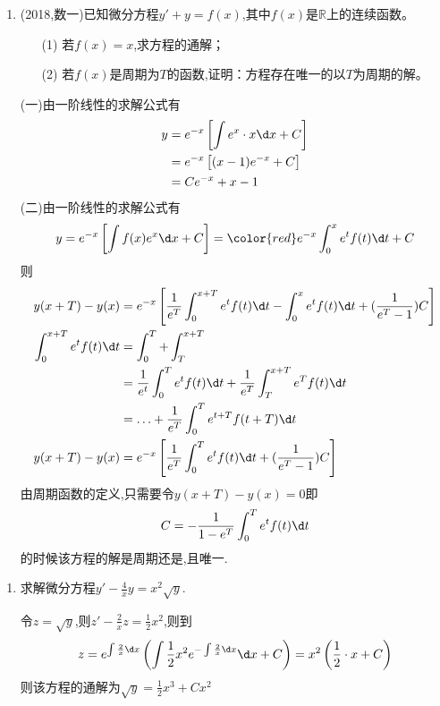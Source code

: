 \documentclass[12pt, a4paper, oneside, UTF8]{ctexbook}
\begin{document}
\begin{enumerate}[label=\arabic*.,start=5]
    \item (2018,数一)已知微分方程$y'+y=f(x)$,其中$f(x)$是$\mathbb{R}$上的连续函数。
    \begin{enumerate}[label=(\roman*)]
        \item[(1)] 若$f(x)=x$,求方程的通解；
        \item[(2)] 若$f(x)$是周期为$T$的函数,证明：方程存在唯一的以$T$为周期的解。
    \end{enumerate}
    
    \begin{solution}
    (一)由一阶线性的求解公式有 
    \begin{align*}
        y &= e^{-x}\left[\int e^x\cdot x\d x + C\right] \\
        &=e^{-x}\left[(x-1)e^{-x}+C\right]\\
        &=Ce^{-x}+x-1
    \end{align*}
    (二)由一阶线性的求解公式有
    $$
    y=e^{-x}\left[\int f(x)e^{x}\d x + C\right] = {\color{red} e^{-x}\int_{0}^{x}e^{t}f(t)\d t+C}
    $$
    则
    \begin{align*}
        y(x+T)-y(x) &= e^{-x}\left[\frac{1}{e^T}\int_{0}^{x+T}e^{t}f(t)\d t - 
        \int_{0}^{x}e^{t}f(t)\d t + (\frac{1}{e^{T}-1})C\right] \\
        \int_{0}^{x+T}e^{t}f(t)\d t &=\int_{0}^{T}+\int_{T}^{x+T} \\
        &=\frac{1}{e^{t}}\int_{0}^{T}e^{t}f(t)\d t + \frac{1}{e^T}\int_{T}^{x+T}e^{T}f(t)\d t \\
        &=\ldots + \frac{1}{e^T}\int_{0}^{T}e^{t+T}f(t+T)\d t \\
        y(x+T)-y(x) & = e^{-x}\left[\frac{1}{e^{T}}\int_{0}^{T}e^{t}f(t)\d t + (\frac{1}{e^{T}-1})C \right] 
    \end{align*}
    由周期函数的定义,只需要令$y(x+T)-y(x)=0$即
    $$
    C = -\frac{1}{1-e^T}\int_{0}^{T}e^tf(t)\d t
    $$
    的时候该方程的解是周期还是,且唯一.
    \end{solution}
\end{enumerate}


\begin{enumerate}[label=\arabic*.,start=6]
    \item 求解微分方程$y'-\frac{4}{x}y=x^2\sqrt{y}$.
    
    \begin{solution}
    令$z=\sqrt{y}$,则$\displaystyle z'-\frac{2}{x}z=\frac{1}{2}x^2$,则到
    $$\displaystyle
    z = e^{\int\frac{2}{x}\d x}\left(\int\frac{1}{2}x^2e^{-\int\frac{2}{x}\d x}\d x + C\right) 
    =x^2\left(\frac{1}{2}\cdot x + C\right)
    $$
    则该方程的通解为$\sqrt{y}=\frac{1}{2}x^3+Cx^2$
    \end{solution}
\end{enumerate}
\end{document}

